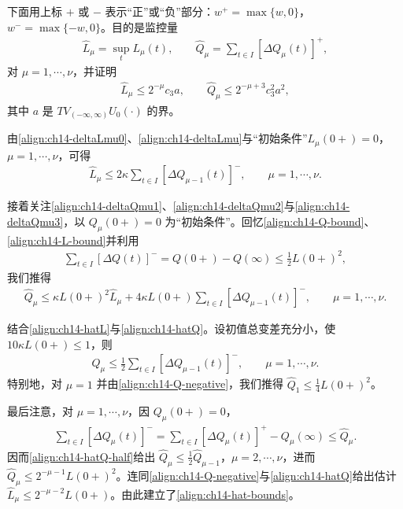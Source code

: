 \documentclass[../../main.tex]{subfiles}
\begin{document}
下面用上标 $+$ 或 $-$ 表示``正''或``负''部分：$w^+=\max\{w,0\}$，$w^-=\max\{-w,0\}$。目的是监控量
\begin{align}
\hat L_\mu=\sup_t L_\mu(t),\qquad \hat Q_\mu=\sum_{t\in I}[\Delta Q_\mu(t)]^+,
\label{align:ch14-hats}
\end{align}
对 $\mu=1,\cdots,\nu$，并证明
\begin{align}
\hat L_\mu\leqslant2^{-\mu}c_3a,\qquad \hat Q_\mu\leqslant2^{-\mu+3}c_3^2a^2,
\label{align:ch14-hat-bounds}
\end{align}
其中 $a$ 是 $TV_{(-\infty,\infty)}U_0(\cdot)$ 的界。

由\eqref{align:ch14-deltaLmu0}、\eqref{align:ch14-deltaLmu}与``初始条件''$L_\mu(0+)=0$，$\mu=1,\cdots,\nu$，可得
\begin{align}
\hat L_\mu\leqslant2\kappa\sum_{t\in I}[\Delta Q_{\mu-1}(t)]^-,\qquad \mu=1,\cdots,\nu.
\label{align:ch14-hatL}
\end{align}

接着关注\eqref{align:ch14-deltaQmu1}、\eqref{align:ch14-deltaQmu2}与\eqref{align:ch14-deltaQmu3}，以 $Q_\mu(0+)=0$ 为``初始条件''。回忆\eqref{align:ch14-Q-bound}、\eqref{align:ch14-L-bound}并利用
\begin{align}
\sum_{t\in I}[\Delta Q(t)]^-=Q(0+)-Q(\infty)\leqslant\tfrac12 L(0+)^2,
\label{align:ch14-Q-negative}
\end{align}
我们推得
\begin{align}
\hat Q_\mu\leqslant\kappa L(0+)^2\hat L_\mu+4\kappa L(0+)\sum_{t\in I}[\Delta Q_{\mu-1}(t)]^-,\qquad \mu=1,\cdots,\nu.
\label{align:ch14-hatQ}
\end{align}

结合\eqref{align:ch14-hatL}与\eqref{align:ch14-hatQ}。设初值总变差充分小，使 $10\kappa L(0+)\leqslant1$，则
\begin{align}
\hat Q_\mu\leqslant\frac12\sum_{t\in I}[\Delta Q_{\mu-1}(t)]^-,\qquad \mu=1,\cdots,\nu.
\label{align:ch14-hatQ-half}
\end{align}
特别地，对 $\mu=1$ 并由\eqref{align:ch14-Q-negative}，我们推得 $\hat Q_1\leqslant\frac14 L(0+)^2$。

最后注意，对 $\mu=1,\cdots,\nu$，因 $Q_\mu(0+)=0$，
\begin{align}
\sum_{t\in I}[\Delta Q_\mu(t)]^-=\sum_{t\in I}[\Delta Q_\mu(t)]^+-Q_\mu(\infty)\leqslant\hat Q_\mu.
\label{align:ch14-Qmu-negative}
\end{align}
因而\eqref{align:ch14-hatQ-half}给出 $\hat Q_\mu\leqslant\frac12\hat Q_{\mu-1}$，$\mu=2,\cdots,\nu$，进而 $\hat Q_\mu\leqslant2^{-\mu-1}L(0+)^2$。连同\eqref{align:ch14-Q-negative}与\eqref{align:ch14-hatQ}给出估计 $\hat L_\mu\leqslant2^{-\mu-2}L(0+)$。由此建立了\eqref{align:ch14-hat-bounds}。
\end{document}
